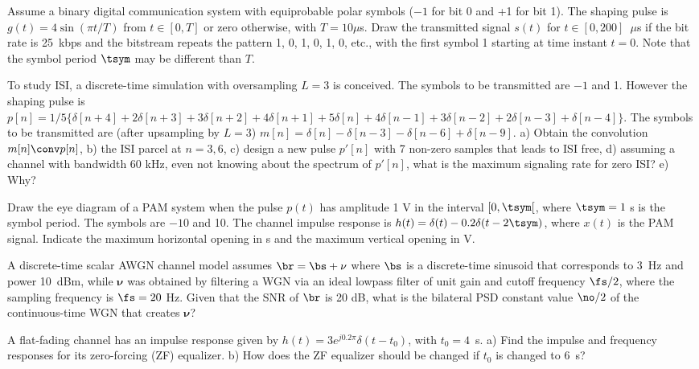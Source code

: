 \begin{exercises}

\item Assume a binary digital communication system with equiprobable polar symbols ($-1$ for bit 0 and +1 for bit 1). The shaping pulse is 
$g(t) = 4 \sin (\pi t / T)$ from $t \in [0,T]$ or zero otherwise, with $T=10 \mu$s. Draw the transmitted signal $s(t)$ for $t \in [0,200]$~$\mu$s if the bit rate is 25~kbps and the bitstream repeats the pattern 1, 0, 1, 0, 1, 0, etc., with the first symbol 1 starting at time instant $t=0$. Note that the symbol period $\tsym$ may be different than $T$.

\item To study ISI, a discrete-time simulation with oversampling $L=3$ is conceived. The symbols to be transmitted are $-1$ and 1. However the shaping pulse is $p[n]=1/5\{\delta[n+4]+2\delta[n+3]+3\delta[n+2]+4\delta[n+1]+5\delta[n]+4\delta[n-1]+3\delta[n-2]+2\delta[n-3]+\delta[n-4]\}$. The symbols to be transmitted are (after upsampling by $L=3$) $m[n]=\delta[n]-\delta[n-3]-\delta[n-6]+\delta[n-9]$. a) Obtain the convolution $m[n] \conv p[n]$, b) the ISI parcel at $n=3,6$, c) design a new pulse $p'[n]$ with 7 non-zero samples that leads to ISI free, d) assuming a channel with bandwidth 60 kHz, even not knowing about the spectrum of $p'[n]$, what is the maximum signaling rate for zero ISI? e) Why?

\item Draw the eye diagram of a PAM system when the pulse $p(t)$ has amplitude 1 V in the interval $[0, \tsym[$, where $\tsym=1$ s is the symbol period. The symbols are $-10$ and 10. The channel impulse response is $h(t)=\delta(t)-0.2 \delta(t-2\tsym)$, where $x(t)$ is the PAM signal. Indicate the maximum horizontal opening in s and the maximum vertical opening in V.

\item A discrete-time scalar AWGN channel model assumes $\br = \bs + \mathbf{\nu}$ where $\bs$ is a discrete-time sinusoid that corresponds to 3~Hz and power 10~dBm, while $\mathbf{\nu}$ was obtained by filtering a WGN via an ideal lowpass filter of unit gain and cutoff frequency $\fs/2$, where the sampling frequency is $\fs=20$ Hz. Given that the SNR of $\br$ is 20 dB, what is the bilateral PSD constant value $\no/2$ of the continuous-time WGN that creates $\mathbf{\nu}$?

\item A flat-fading channel has an impulse response given by $h(t) = 3 e^{j 0.2 \pi} \delta(t-t_0)$, with $t_0=4$~s. a) Find the impulse and frequency responses for its zero-forcing (ZF) equalizer. b) How does the ZF equalizer should be changed if $t_0$ is changed to 6~s?


\end{exercises}
